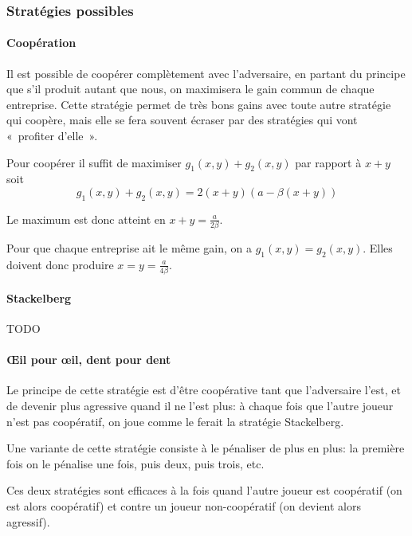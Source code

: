   \subsubsection{Stratégies possibles}
    \paragraph{Coopération} Il est possible de coopérer complètement avec
      l'adversaire, en partant du principe que s'il produit autant que nous,
      on maximisera le gain commun de chaque entreprise.
      Cette stratégie permet de très bons gains avec toute autre stratégie qui
      coopère, mais elle se fera souvent écraser par des stratégies qui vont
      «~profiter d'elle~».

      Pour coopérer il suffit de maximiser $g_1(x, y)+g_2(x, y)$ par rapport à
      $x+y$ soit
        \[g_1(x, y) + g_2(x, y) = 2(x+y)(a - \beta(x+y))\]

      Le maximum est donc atteint en $x+y=\frac a {2\beta}$.

      Pour que chaque entreprise ait le même gain, on a $g_1(x, y) = g_2(x, y)$.
      Elles doivent donc produire $x=y=\frac a {4\beta}$.

    \paragraph{Stackelberg}
      TODO

    \paragraph{Œil pour œil, dent pour dent}
      Le principe de cette stratégie est d'être coopérative tant que
      l'adversaire l'est, et de devenir plus agressive quand il ne l'est plus:
      à chaque fois que l'autre joueur n'est pas coopératif, on joue comme le
      ferait la stratégie Stackelberg.

      Une variante de cette stratégie consiste à le pénaliser de plus en plus:
      la première fois on le pénalise une fois, puis deux, puis trois, etc.

      Ces deux stratégies sont efficaces à la fois quand l'autre joueur est
      coopératif (on est alors coopératif) et contre un joueur non-coopératif
      (on devient alors agressif).
